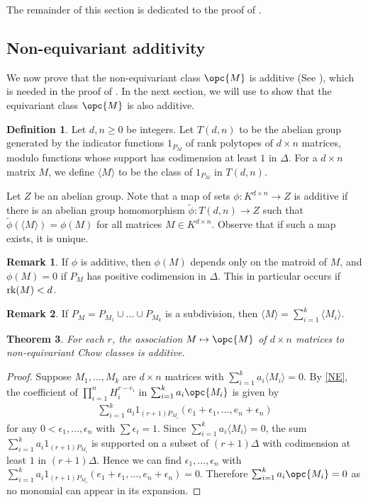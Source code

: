 \documentclass[12pt]{amsart}
\newcommand{\rk}{{\rm rk}}
\theoremstyle{plain}
\newtheorem{Thm}{Theorem}[section]
\theoremstyle{definition}
\newtheorem{Def}{Definition}[section]
\newtheorem{Rem}[Thm]{Remark}
\theoremstyle{remark}
\begin{document}
The remainder of this section is dedicated to the proof of .

\subsection{Non-equivariant additivity}
We now prove that the non-equivariant class $\opc{M}$ is additive (See ), which is needed in the proof of . In the next section, we will use  to show that the equivariant class $\opc{M}$ is also additive.

\begin{Def}\label{additivedef}
Let $d, n \geq 0$ be integers. Let $T(d,n)$ to be the abelian group generated by the indicator functions $1_{P_M}$ of rank polytopes of $d \times n$ matrices, modulo functions whose support has codimension at least $1$ in $\Delta$. For a $d \times n$ matrix $M$, we define $\langle M \rangle$ to be the class of $1_{P_M}$ in $T(d,n)$.

Let $Z$ be an abelian group. Note that a map of sets $\phi : K^{d \times n} \to Z$ is additive if there is an abelian group homomorphism $\tilde\phi : T(d,n) \to Z$ such that $\tilde\phi(\langle M \rangle) = \phi(M)$ for all matrices $M \in K^{d \times n}$. Observe that if such a map exists, it is unique. 
\end{Def}
\begin{Rem}
If $\phi$ is additive, then $\phi(M)$ depends only on the matroid of $M$, and $\phi(M) = 0$ if $P_M$ has positive codimension in $\Delta$. This in particular occurs if $\rk(M)<d$.
\end{Rem}
\begin{Rem}
If $P_M = P_{M_1} \cup \ldots \cup P_{M_k}$ is a subdivision, then $\langle M\rangle = \sum_{i=1}^k \langle M_i\rangle.$
\end{Rem}

\begin{Thm} \label{realvalnoneq} For each $r$, the association $M \mapsto \opc{M}$ of $d \times n$ matrices to non-equivariant Chow classes is additive.
\end{Thm}
\begin{proof}
Suppose $M_1,\ldots,M_k$ are $d \times n$ matrices with $\sum_{i=1}^k a_i\langle M_i \rangle=0$. By \cref{NE}, the coefficient of $\prod_{i=1}^{n} H_i^{r-e_i}$ in $\sum_{i=1}^k a_i \opc{M_i} $ is given by
\begin{align*}
\sum_{i=1}^k a_i 1_{(r+1) P_{M_i}} (e_1 + \epsilon_1, \ldots, e_n + \epsilon_n)
\end{align*}
for any $0<\epsilon_1,\ldots,\epsilon_n$ with $\sum \epsilon_i=1$.
Since $\sum_{i=1}^k a_i \langle M_i \rangle = 0$, the sum $\sum_{i=1}^k a_i 1_{(r+1) P_{M_i}}$ is supported on a subset of $(r+1)\Delta$ with codimension at least $1$ in $(r+1)\Delta$. Hence we can find $\epsilon_1, \ldots, \epsilon_n$ with $\sum_{i=1}^k a_i 1_{(r+1) P_{M_i}} (e_1 + \epsilon_1, \ldots, e_n + \epsilon_n) = 0$. Therefore $\sum_{i=1}^k a_i \opc{M_i} = 0$ as no monomial can appear in its expansion.
\end{proof}
\end{document}
